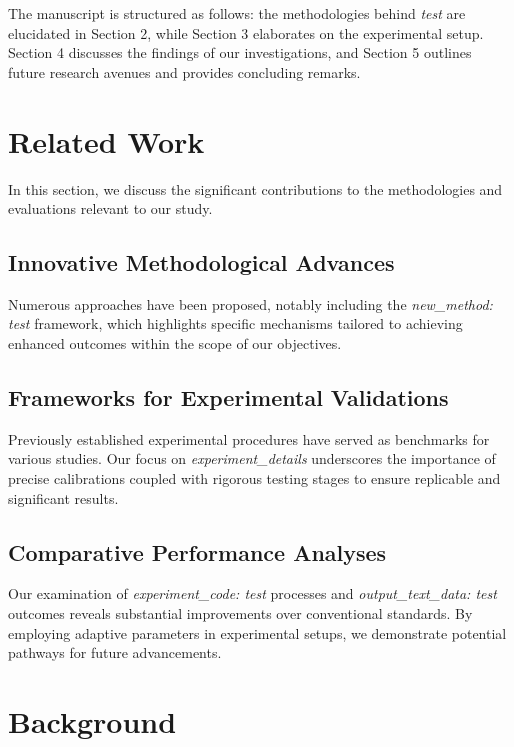 \documentclass{article} %
\begin{document}
The manuscript is structured as follows: the methodologies behind \textit{test} are elucidated in Section 2, while Section 3 elaborates on the experimental setup. Section 4 discusses the findings of our investigations, and Section 5 outlines future research avenues and provides concluding remarks.

\section{Related Work}
\label{sec:related}

In this section, we discuss the significant contributions to the methodologies and evaluations relevant to our study.

\subsection{Innovative Methodological Advances}

Numerous approaches have been proposed, notably including the \textit{new\_method: test} framework, which highlights specific mechanisms tailored to achieving enhanced outcomes within the scope of our objectives.

\subsection{Frameworks for Experimental Validations}

Previously established experimental procedures have served as benchmarks for various studies. Our focus on \textit{experiment\_details} underscores the importance of precise calibrations coupled with rigorous testing stages to ensure replicable and significant results.

\subsection{Comparative Performance Analyses}

Our examination of \textit{experiment\_code: test} processes and \textit{output\_text\_data: test} outcomes reveals substantial improvements over conventional standards. By employing adaptive parameters in experimental setups, we demonstrate potential pathways for future advancements.

\section{Background}
\label{sec:background}
\end{document}
